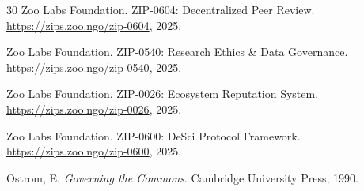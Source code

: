 \documentclass[11pt,letterpaper]{article}
\begin{document}
\begin{thebibliography}{30}
Zoo Labs Foundation.
\newblock ZIP-0604: Decentralized Peer Review.
\newblock \url{https://zips.zoo.ngo/zip-0604}, 2025.

Zoo Labs Foundation.
\newblock ZIP-0540: Research Ethics \& Data Governance.
\newblock \url{https://zips.zoo.ngo/zip-0540}, 2025.

Zoo Labs Foundation.
\newblock ZIP-0026: Ecosystem Reputation System.
\newblock \url{https://zips.zoo.ngo/zip-0026}, 2025.

Zoo Labs Foundation.
\newblock ZIP-0600: DeSci Protocol Framework.
\newblock \url{https://zips.zoo.ngo/zip-0600}, 2025.

Ostrom, E.
\newblock \emph{Governing the Commons}.
\newblock Cambridge University Press, 1990.

\end{thebibliography}
\end{document}
